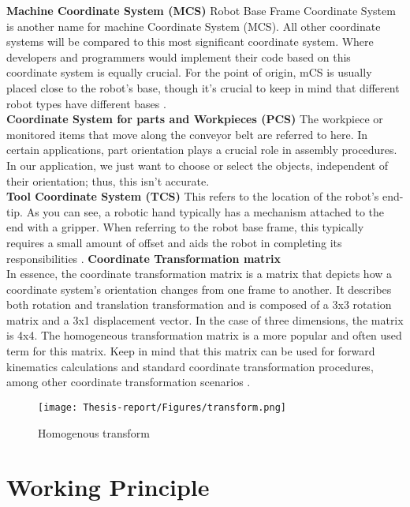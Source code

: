 \documentclass[12pt]{article}
\begin{document}
 \textbf{Machine Coordinate System (MCS)}
Robot Base Frame Coordinate System is another name for machine Coordinate System (MCS). All other coordinate systems will be compared to this most significant coordinate system. Where developers and programmers would implement their code based on this coordinate system is equally crucial. For the point of origin, mCS is usually placed close to the robot's base, though it's crucial to keep in mind that different robot types have different bases \cite{ref24}.\\

 \textbf{Coordinate System for parts and Workpieces (PCS)}
The workpiece or monitored items that move along the conveyor belt are referred to here. In certain applications, part orientation plays a crucial role in assembly procedures. In our application, we just want to choose or select the objects, independent of their orientation; thus, this isn't accurate\cite{ref24}.\\

 \textbf{Tool Coordinate System (TCS)}
 This refers to the location of the robot's end-tip. As you can see, a robotic hand typically has a mechanism attached to the end with a gripper. When referring to the robot base frame, this typically requires a small amount of offset and aids the robot in completing its responsibilities \cite{ref24}.
 \textbf{ Coordinate Transformation matrix}  \\
 In essence, the coordinate transformation matrix is a matrix that depicts how a coordinate system's orientation changes from one frame to another. It describes both rotation and translation transformation and is composed of a 3x3 rotation matrix and a 3x1 displacement vector.  In the case of three dimensions, the matrix is 4x4.  The homogeneous transformation matrix is a more popular and often used term for this matrix.  Keep in mind that this matrix can be used for forward kinematics calculations and standard coordinate transformation procedures, among other coordinate transformation scenarios \cite{ref24}.

\begin{figure}[h]
    \centering
    \texttt{[image: Thesis-report/Figures/transform.png]} 
    \caption{Homogenous transform \cite{ref25}}
    \label{fig:Photoneo_Camera}
\end{figure}
\newpage
\section{Working Principle}
\end{document}
